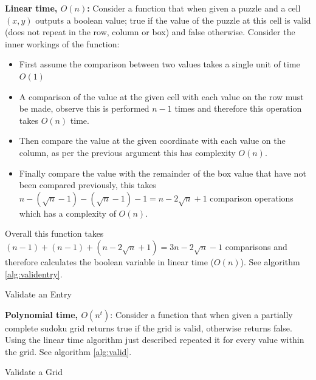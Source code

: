 \documentclass[a4paper,11pt]{report}
\newcounter{row}
\newcounter{col}
\begin{document}
\textbf{Linear time, $O(n)$:} Consider a function that when given a puzzle and a cell $(x,y)$ outputs a boolean value; true if the value of the puzzle at this cell is valid (does not repeat in the row, column or box) and false otherwise. Consider the inner workings of the function: 
\begin{itemize}
\item First assume the comparison between two values takes a single unit of time $O(1)$
\item A comparison of the value at the given cell with each value on the row must be made, observe this is performed $n-1$ times and therefore this operation takes $O(n)$ time.
\item Then compare the value at the given coordinate with each value on the column, as per the previous argument this has complexity $O(n)$.
\item Finally compare the value with the remainder of the box value that have not been compared previously, this takes $n-(\sqrt{n}-1)-(\sqrt{n}-1)-1= n-2\sqrt{n}+1$ comparison operations which has a complexity of $O(n)$.
\end{itemize}
Overall this function takes $(n-1)+(n-1)+(n-2\sqrt{n}+1) = 3n -2\sqrt{n}-1$ comparisons and therefore calculates the boolean variable in linear time ($O(n)$). See algorithm \ref{alg:validentry}.

\begin{algorithm}
\caption{Validate an Entry\label{alg:validentry}}
\begin{algorithmic}
 
\EndIf
\EndIf
\EndFor
{} 
\EndIf
\EndIf
\EndFor
{} 
\EndIf
\EndFor
{}
\EndProcedure
\end{algorithmic}
\end{algorithm}

\textbf{Polynomial time, $O(n^t)$}: Consider a function that when given a partially complete sudoku grid returns true if the grid is valid, otherwise returns false. Using the linear time algorithm just described repeated it for every value within the grid. See algorithm \ref{alg:valid}.

\begin{algorithm}
\caption{Validate a Grid\label{alg:valid}}
\begin{algorithmic}
 
\EndIf
\EndFor
\EndFor
{}
\EndProcedure
\end{algorithmic}
\end{algorithm}
\end{document}
